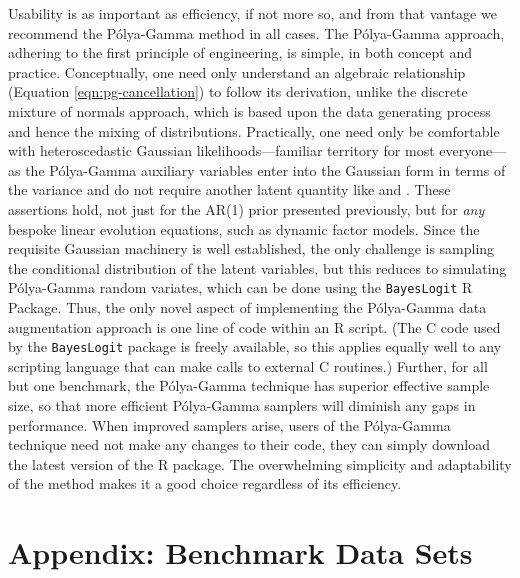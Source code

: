 \documentclass[12pt]{article}
\newcommand{\Polya}{P\'{o}lya}
\begin{document}
Usability is as important as efficiency, if not more so, and from that vantage
we recommend the \Polya-Gamma method in all cases.  The \Polya-Gamma approach,
adhering to the first principle of engineering, is simple, in both concept and
practice.  Conceptually, one need only understand an algebraic relationship
(Equation \ref{eqn:pg-cancellation}) to follow its derivation, unlike the
discrete mixture of normals approach, which is based upon the data generating
process and hence the mixing of distributions.  Practically, one need only be
comfortable with heteroscedastic Gaussian likelihoods---familiar territory for
most everyone---as the \Polya-Gamma auxiliary variables enter into the Gaussian
form in terms of the variance and do not require another latent quantity like
\cite{fruhwirth-schnatter-etal-2009} and \cite{fussl-etal-2013}.  These
assertions hold, not just for the AR(1) prior presented previously, but for
\emph{any} bespoke linear evolution equations, such as dynamic factor models.
Since the requisite Gaussian machinery is well established, the only challenge
is sampling the conditional distribution of the latent variables, but this
reduces to simulating \Polya-Gamma random variates, which can be done using the
\texttt{BayesLogit} R Package.  Thus, the only novel aspect of implementing the
\Polya-Gamma data augmentation approach is one line of code within an R script.
(The C code used by the \texttt{BayesLogit} package is freely available, so this
applies equally well to any scripting language that can make calls to external C
routines.)  Further, for all but one benchmark, the \Polya-Gamma technique has
superior effective sample size, so that more efficient \Polya-Gamma samplers
will diminish any gaps in performance.  When improved samplers arise, users of
the \Polya-Gamma technique need not make any changes to their code, they can
simply download the latest version of the R package.  The overwhelming
simplicity and adaptability of the method makes it a good choice regardless of
its efficiency.

\section*{Appendix: Benchmark Data Sets}
\label{sec:benchmark-details}

\end{document}
